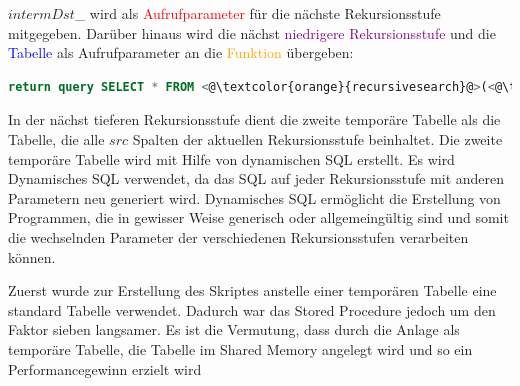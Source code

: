 $intermDst$\_ wird als \textcolor{red}{Aufrufparameter} für die nächste Rekursionsstufe mitgegeben. Darüber hinaus wird die nächst \textcolor{purple}{niedrigere Rekursionsstufe} und die
\textcolor{blue}{Tabelle} als Aufrufparameter an die \textcolor{orange}{Funktion} übergeben:
\begin{lstlisting}[language=SQL,caption = Aufrufen der nächst tieferen Rekursionsstufe,frame=single, label={2.AbbruchbedingungRecursiveSearch.listing} ]
    return query SELECT * FROM <@\textcolor{orange}{recursivesearch}@>(<@\textcolor{red}{intermDst\_}@>, <@\textcolor{purple}{iRecursionDepth - 1}@>, <@\textcolor{blue}{sTable}@>);
\end{lstlisting}
In der nächst tieferen Rekursionsstufe dient die zweite temporäre Tabelle als die Tabelle, die alle $src$ Spalten der aktuellen Rekursionsstufe beinhaltet.
Die zweite temporäre Tabelle wird mit Hilfe von dynamischen \ac{SQL} erstellt.
Es wird Dynamisches SQL verwendet, da das \ac{SQL} auf jeder Rekursionsstufe mit anderen Parametern neu generiert wird.
Dynamisches SQL ermöglicht die Erstellung von Programmen, die in gewisser Weise generisch oder allgemeingültig sind und somit die wechselnden Parameter der verschiedenen Rekursionsstufen verarbeiten können.\cite[S.316 - 317]{froehlich01}

Zuerst wurde zur Erstellung des Skriptes anstelle einer temporären Tabelle eine standard Tabelle verwendet.
Dadurch war das Stored Procedure jedoch um den Faktor sieben langsamer.
Es ist die Vermutung, dass durch die Anlage als temporäre Tabelle, die Tabelle im Shared Memory angelegt wird und so ein Performancegewinn erzielt wird \cite[S.26]{froehlich01}

